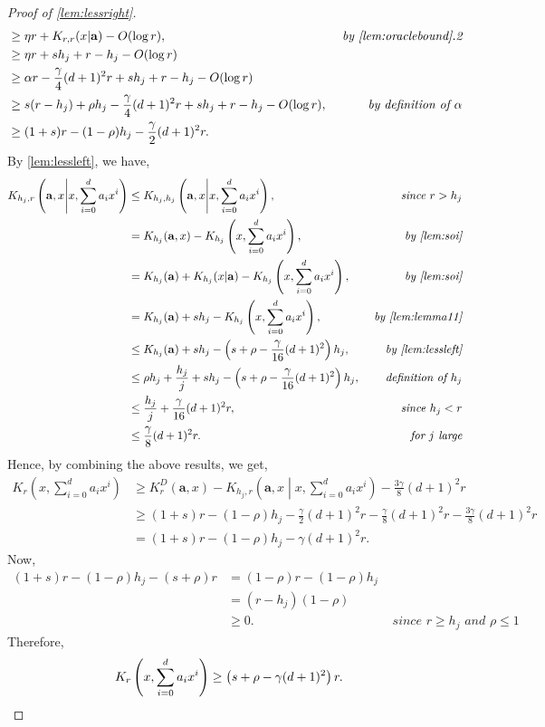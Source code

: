 \documentclass[a4paper,UKenglish,cleveref,autoref,thm-restate]{lipics-v2021}
\begin{document}
\begin{proof}[Proof of \cref{lem:lessright}]
\begin{align*}
		&\geq\eta r+K_{r,r}(x|\mathbf{a})-O(\log r),&\textit{ by \cref{lem:oraclebound}.2}\\
		&\geq\eta r+sh_j+r-h_j-O(\log r)\\%
		&\geq\alpha r-\frac{\gamma}{4}(d+1)^2r+sh_j+r-h_j-O(\log r)\\
		&\geq s(r-h_j)+\rho h_j-\frac{\gamma}{4}(d+1)^2r+sh_j+r-h_j-O(\log r),&\textit{ by definition of $\alpha$}\\
		&\geq(1+s)r-(1-\rho)h_j-\frac{\gamma}{2}(d+1)^2r.
	\end{align*}
	By \cref{lem:lessleft}, we have, 
	\begin{align*}
		K_{h_j,r}\left(\mathbf{a},x\middle|x,\sum_{i=0}^{d}a_ix^i\right)&\leq K_{h_j,h_j}\left(\mathbf{a},x\middle|x,\sum_{i=0}^{d}a_ix^i\right),&\textit{$\textit{since } r>h_j$}\\
		&=K_{h_j}(\mathbf{a},x)-K_{h_j}\left(x,\sum_{i=0}^{d}a_ix^i\right),&\textit{ by \cref{lem:soi}}\\
		&=K_{h_j}(\mathbf{a})+K_{h_j}(x|\mathbf{a})-K_{h_j}\left(x,\sum_{i=0}^{d}a_ix^i\right),&\textit{ by \cref{lem:soi}}\\
		&=K_{h_j}(\mathbf{a})+sh_j-K_{h_j}\left(x,\sum_{i=0}^{d}a_ix^i\right),&\textit{ by \cref{lem:lemma11}}\\
		&\leq K_{h_j}(\mathbf{a})+sh_j-\left(s+\rho-\frac{\gamma}{16}(d+1)^2\right)h_j,&\textit{ by \cref{lem:lessleft}}\\
		&\leq\rho h_j+\frac{h_j}{j}+sh_j-\left(s+\rho-\frac{\gamma}{16}(d+1)^2\right)h_j,&\textit{ definition of $h_j$}\\
		&\leq\frac{h_j}{j}+\frac{\gamma}{16}(d+1)^2r,&\textit{since }\textit{$h_j<r$}\\
		&\leq\frac{\gamma}{8}(d+1)^2r.&\textit{ for $j$ large}
	\end{align*}
	Hence, by combining the above results, we get,
	\begin{align*}
		K_r\left(x,\sum_{i=0}^{d}a_ix^i\right)&\geq K_r^D\left(\mathbf{a},x\right)-K_{h_j,r}\left(\mathbf{a},x\middle|x,\sum_{i=0}^{d}a_ix^i\right)-\frac{3\gamma}{8}(d+1)^2r\\
		&\geq(1+s)r-(1-\rho)h_j-\frac{\gamma}{2}(d+1)^2r-\frac{\gamma}{8}(d+1)^2r-\frac{3\gamma}{8}(d+1)^2r\\
		&=(1+s)r-(1-\rho)h_j-\gamma(d+1)^2r.
	\end{align*}
	Now, 
	\begin{align*}
		(1+s)r-(1-\rho)h_j-(s+\rho)r&=(1-\rho)r-(1-\rho)h_j\\
		&=(r-h_j)(1-\rho)\\
		&\geq0.&\textit { since $r\geq h_j$ and $\rho\leq1$}
	\end{align*}
	Therefore, 
	\begin{align*}
		K_r\left(x,\sum_{i=0}^{d}a_ix^i\right)&\geq\left(s+\rho-\gamma(d+1)^2\right)r.\qedhere
	\end{align*}
\end{proof}
\end{document}
